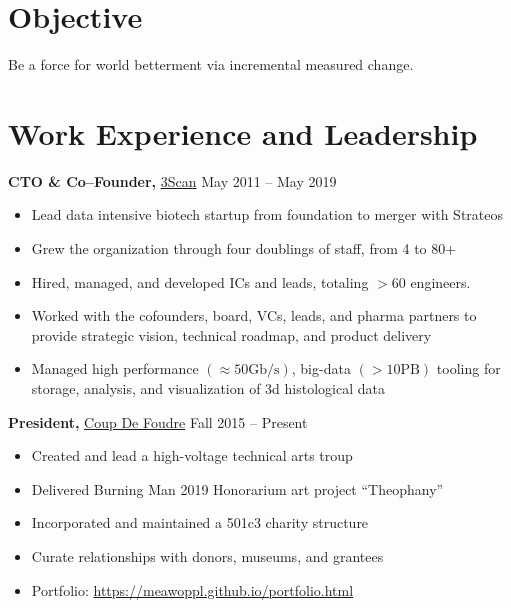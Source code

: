 \documentclass{res}
\begin{document}

\address{{\bf Home Address} \\ 166 Sanchez \#7 \\ San Francisco, CA 94114 \\
        (520) 591-5245 \\ meawoppl@gmail.com }
\address{{\bf Workshop Address} \\ 951 Hudson Ave \\ San Francisco, CA 94124 \\
        (562) 546-3326 \\ \href{https://meawoppl.github.io}{meawoppl.github.io}}

\begin{resume}

\section{Objective}
Be a force for world betterment via incremental measured change.

\section{Work Experience and Leadership}

{\bf CTO \& Co--Founder,} \href{http://www.3scan.com}{3Scan} \hfill
May 2011 -- May 2019
\begin{itemize}  \itemsep -2pt
  \item Lead data intensive biotech startup from foundation to merger with Strateos
  \item Grew the organization through four doublings of staff, from 4 to 80+
  \item Hired, managed, and developed ICs and leads, totaling $> 60$ engineers.
  \item Worked with the cofounders, board, VCs, leads, and pharma partners to provide strategic vision,
    technical roadmap, and product delivery
  \item Managed high performance $(\approx 50 \mathrm{Gb/s})$, big-data $(> 10\mathrm{PB})$ tooling for
    storage, analysis, and visualization of 3d histological data
\end{itemize}

{\bf President,}  \href{http://coupdefoud.re}{Coup De Foudre} \hfill   Fall 2015 -- Present
\begin{itemize} \itemsep -2pt
  \item Created and lead a high-voltage technical arts troup
  \item Delivered Burning Man 2019 Honorarium art project ``Theophany''
  \item Incorporated and maintained a 501c3 charity structure
  \item Curate relationships with donors, museums, and grantees
  \item Portfolio: \href{https://meawoppl.github.io/portfolio.html}{https://meawoppl.github.io/portfolio.html}
\end{itemize}


\end{resume}
\end{document}
